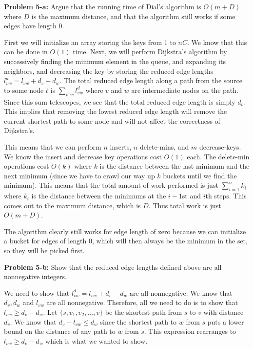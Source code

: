 \documentclass[psamsfonts]{amsart}
\newenvironment{sol}{\vspace{0.25cm}{\large \bfseries Solution:}}{\qedsymbol}
\newenvironment{prob}[1]{\begin{framed}{\large \bfseries Problem #1:}}{\end{framed}}
\begin{document}
\begin{prob}{5-a}
Argue that the running time of Dial's algorithm is $O(m+D)$ where $D$ is the maximum distance, and that the algorithm still works if some edges have length 0.
\end{prob}
\begin{sol}
First we will initialize an array storing the keys from 1 to $nC$. We know that this can be done in $O(1)$ time. Next, we will perform Dijkstra's algorithm by successively finding the minimum element in the queue, and expanding its neighbors, and decreasing the key by storing the reduced edge lengths $l_{vw}^d = l_{vw} + d_v - d_w$. The total reduced edge length along a path from the source to some node $t$ is $\sum_{v,w} l_{vw}^d$ where $v$ and $w$ are intermediate nodes on the path. Since this sum telescopes, we see that the total reduced edge length is simply $d_t$. This implies that removing the lowest reduced edge length will remove the current shortest path to some node and will not affect the correctness of Dijkstra's.

This means that we can perform $n$ inserts, $n$ delete-mins, and $m$ decrease-keys. We know the insert and decrease key operations cost $O(1)$ each. The delete-min operations cost $O(k)$ where $k$ is the distance between the last minimum and the next minimum (since we have to crawl our way up $k$ buckets until we find the minimum). This means that the total amount of work performed is just $\sum_{i=1}^n k_i$ where $k_i$ is the distance between the minimums at the $i-1$st and $i$th steps. This comes out to the maximum distance, which is $D$. Thus total work is just $O(m + D)$. 

The algorithm clearly still works for edge length of zero because we can initialize a bucket for edges of length 0, which will then always be the minimum in the set, so they will be picked first.
\end{sol}

\begin{prob}{5-b}
Show that the reduced edge lengths defined above are all nonnegative integers.
\end{prob}
\begin{sol}
We need to show that $l_{vw}^d = l_{vw} + d_v - d_w$ are all nonnegative. We know that $d_v, d_w$ and $l_{vw}$ are all nonnegative. Therefore, all we need to do is to show that $l_{vw} \geq d_v - d_w$. Let $\{s, v_1, v_2, \ldots, v\}$ be the shortest path from $s$ to $v$ with distance $d_v$. We know that $d_v + l_{vw} \leq d_{w}$ since the shortest path to $w$ from $s$ puts a lower bound on the distance of any path to $w$ from $s$. This expression rearranges to $l_{vw} \geq d_v - d_w$ which is what we wanted to show.
\end{sol}
\end{document}
